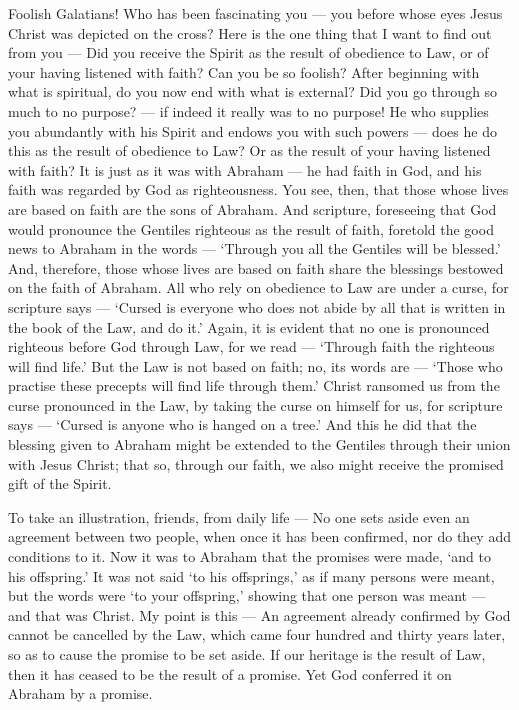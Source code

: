  Foolish Galatians! Who has been fascinating you --- you
before whose eyes Jesus Christ was depicted on the cross? 
Here is the one thing that I want to find out from you --- Did you
receive the Spirit as the result of obedience to Law, or of your having
listened with faith?  Can you be so foolish? After beginning
with what is spiritual, do you now end with what is external?
 Did you go through so much to no purpose? --- if indeed it
really was to no purpose!  He who supplies you abundantly
with his Spirit and endows you with such powers --- does he do this as
the result of obedience to Law? Or as the result of your having listened
with faith?  It is just as it was with Abraham --- he had
faith in God, and his faith was regarded by God as righteousness.
 You see, then, that those whose lives are based on faith
are the sons of Abraham.  And scripture, foreseeing that God
would pronounce the Gentiles righteous as the result of faith, foretold
the good news to Abraham in the words --- `Through you all the Gentiles
will be blessed.'  And, therefore, those whose lives are
based on faith share the blessings bestowed on the faith of Abraham.
 All who rely on obedience to Law are under a curse, for
scripture says --- `Cursed is everyone who does not abide by all that is
written in the book of the Law, and do it.'  Again, it is
evident that no one is pronounced righteous before God through Law, for
we read --- `Through faith the righteous will find life.' 
But the Law is not based on faith; no, its words are --- `Those who
practise these precepts will find life through them.' 
Christ ransomed us from the curse pronounced in the Law, by taking the
curse on himself for us, for scripture says --- `Cursed is anyone who is
hanged on a tree.'  And this he did that the blessing given
to Abraham might be extended to the Gentiles through their union with
Jesus Christ; that so, through our faith, we also might receive the
promised gift of the Spirit.

 To take an illustration, friends, from daily life --- No
one sets aside even an agreement between two people, when once it has
been confirmed, nor do they add conditions to it.  Now it
was to Abraham that the promises were made, `and to his offspring.' It
was not said `to his offsprings,' as if many persons were meant, but the
words were `to your offspring,' showing that one person was meant ---
and that was Christ.  My point is this --- An agreement
already confirmed by God cannot be cancelled by the Law, which came four
hundred and thirty years later, so as to cause the promise to be set
aside.  If our heritage is the result of Law, then it has
ceased to be the result of a promise. Yet God conferred it on Abraham by
a promise.


